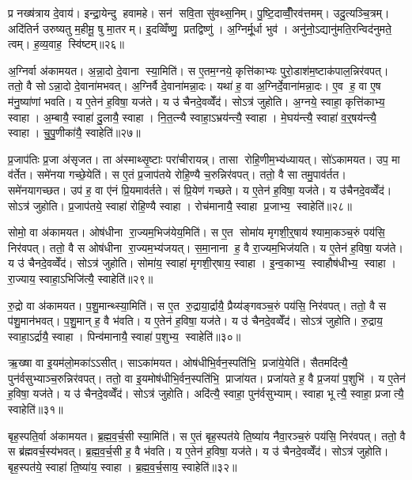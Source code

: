 प्र नख्ष॑त्राय दे॒वाय॑। इन्द्रा॒येन्दु हवामहे। सन॑ सवि॒ता सु॑वथ्स॒निम्। पु॒ष्टि॒दाव्वीँ॒रव॑त्तमम्। उदु॒त्यञ्चि॒त्रम्। अदि॑तिर्न उरुष्यतु म॒हीमू॒ षु मा॒तरम्। इ॒दव्विँष्णु॒ प्रतद्विष्णु॑। अ॒ग्निर्मू॒र्धा भुव॑। अनु॑नो॒ऽद्यानु॑मति॒रन्विद॑नुमते॒ त्वम्। ह॒व्य॒वाह॒ स्वि॑ष्टम्॥२६॥\anuvakamend[आ॒य॒त्य॑गम॒थ्स्वि॑ष्टम्]

अ॒ग्निर्वा अ॑कामयत। अ॒न्ना॒दो दे॒वाना स्या॒मिति॑। स ए॒तम॒ग्नये॒ कृत्ति॑काभ्यः पुरो॒डाश॑म॒ष्टाक॑पाल॒न्निर॑वपत्। ततो॒ वै सोऽन्ना॒दो दे॒वाना॑मभवत्। अ॒ग्निर्वै दे॒वाना॑मन्ना॒दः। यथा॑ ह॒ वा अ॒ग्निर्दे॒वाना॑मन्ना॒दः। ए॒व ह॒ वा ए॒ष म॑नु॒ष्या॑णां भवति। य ए॒तेन॑ ह॒विषा॒ यज॑ते। य उ॑ चैनदे॒वव्वेँद॑। सोऽत्र॑ जुहोति। अ॒ग्नये॒ स्वाहा॒ कृत्ति॑काभ्य॒ स्वाहा। अ॒म्बायै॒ स्वाहा॑ दु॒लायै॒ स्वाहा। नि॒त॒त्न्यै स्वाहा॒ऽभ्रय॑न्त्यै॒ स्वाहा। मे॒घय॑न्त्यै॒ स्वाहा॑ व॒र्॒षय॑न्त्यै॒ स्वाहा। चु॒पु॒णीका॑यै॒ स्वाहेति॑॥२७॥

प्र॒जाप॑तिः प्र॒जा अ॑सृजत। ता अ॑स्माथ्सृ॒ष्टाः परा॑चीरायन्न्। तासा रोहि॒णीम॒भ्य॑ध्यायत्। सो॑ऽकामयत। उप॒ मा व॑र्तेत। समे॑नया गच्छे॒येति॑। स ए॒तं प्र॒जाप॑तये रोहि॒ण्यै च॒रुन्निर॑वपत्। ततो॒ वै सा तमु॒पाव॑र्तत। समे॑नयागच्छत। उप॑ ह॒ वा ए॑नं प्रि॒यमाव॑र्तते। सं प्रि॒येण॑ गच्छते। य ए॒तेन॑ ह॒विषा॒ यज॑ते। य उ॑चैनदे॒वव्वेँद॑। सोऽत्र॑ जुहोति। प्र॒जाप॑तये॒ स्वाहा॑ रोहि॒ण्यै स्वाहा। रोच॑मानायै॒ स्वाहा प्र॒जाभ्य॒ स्वाहेति॑॥२८॥

सोमो॒ वा अ॑कामयत। ओष॑धीना रा॒ज्यम॒भिज॑येय॒मिति॑। स ए॒त सोमा॑य मृगशी॒र्॒षाय॑ श्यामा॒कञ्च॒रुं पय॑सि॒ निर॑वपत्। ततो॒ वै स ओष॑धीना रा॒ज्यम॒भ्य॑जयत्। स॒मा॒नाना ह॒ वै रा॒ज्यम॒भिज॑यति। य ए॒तेन॑ ह॒विषा॒ यज॑ते। य उ॑ चैनदे॒वव्वेँद॑। सोऽत्र॑ जुहोति। सोमा॑य॒ स्वाहा॑ मृगशी॒र्‌षाय॒ स्वाहा। इ॒न्व॒काभ्य॒ स्वाहौष॑धीभ्य॒ स्वाहा। रा॒ज्याय॒ स्वाहा॒ऽभिजि॑त्यै॒ स्वाहेति॑॥२९॥

रु॒द्रो वा अ॑कामयत। प॒शु॒मान्थ्स्या॒मिति॑। स ए॒त रु॒द्राया॒र्द्रायै॒ प्रैय्य॑ङ्गवञ्च॒रुं पय॑सि॒ निर॑वपत्। ततो॒ वै स प॑शु॒मान॑भवत्। प॒शु॒मान् ह॒ वै भ॑वति। य ए॒तेन॑ ह॒विषा॒ यज॑ते। य उ॑ चैनदे॒वव्वेँद॑। सोऽत्र॑ जुहोति। रु॒द्राय॒ स्वाहा॒ऽर्द्रायै॒ स्वाहा। पिन्व॑मानायै॒ स्वाहा॑ प॒शुभ्य॒ स्वाहेति॑॥३०॥

ऋ॒ख्षा वा इ॒यम॑लो॒मका॑ऽऽसीत्। साऽका॑मयत। ओष॑धीभि॒र्वन॒स्पति॑भि॒ प्रजा॑ये॒येति॑। सैतमदि॑त्यै॒ पुन॑र्वसुभ्याञ्च॒रुन्निर॑वपत्। ततो॒ वा इ॒यमोष॑धीभि॒र्वन॒स्पति॑भि॒ प्राजा॑यत। प्रजा॑यते ह॒ वै प्र॒जया॑ प॒शुभि॑। य ए॒तेन॑ ह॒विषा॒ यज॑ते। य उ॑ चैनदे॒वव्वेँद॑। सोऽत्र॑ जुहोति। अदि॑त्यै॒ स्वाहा॒ पुन॑र्वसुभ्याम्। स्वाहा भूत्यै॒ स्वाहा॒ प्रजात्यै॒ स्वाहेति॑॥३१॥

बृह॒स्पति॒र्वा अ॑कामयत। ब्र॒ह्म॒व॒र्च॒सी स्या॒मिति॑। स ए॒तं बृह॒स्पत॑ये ति॒ष्या॑य नैवा॒रञ्च॒रुं पय॑सि॒ निर॑वपत्। ततो॒ वै स ब्र॑ह्मवर्च॒स्य॑भवत्। ब्र॒ह्म॒व॒र्च॒सी ह॒ वै भ॑वति। य ए॒तेन॑ ह॒विषा॒ यज॑ते। य उ॑ चैनदे॒वव्वेँद॑। सोऽत्र॑ जुहोति। बृह॒स्पत॑ये॒ स्वाहा॑ ति॒ष्या॑य॒ स्वाहा। ब्र॒ह्म॒व॒र्च॒साय॒ स्वाहेति॑॥३२॥

